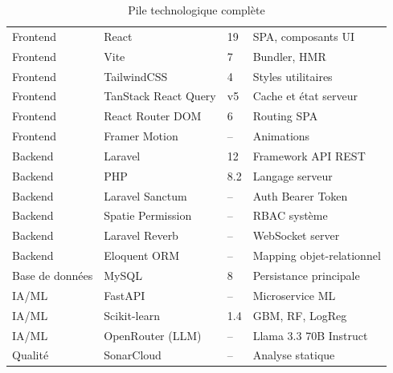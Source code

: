 \begin{table}[H]
  \centering
  \caption{Pile technologique complète}
  \label{tab:techstack}
  \small
  \begin{tabularx}{\textwidth}{L{3cm}L{3.5cm}C{1.8cm}X}
    \toprule
     &  &  &  \\
    \midrule
    Frontend      & React                  & 19       & SPA, composants UI \\
    Frontend      & Vite                   & 7        & Bundler, HMR \\
    Frontend      & TailwindCSS            & 4        & Styles utilitaires \\
    Frontend      & TanStack React Query   & v5       & Cache et état serveur \\
    Frontend      & React Router DOM       & 6        & Routing SPA \\
    Frontend      & Framer Motion          & --       & Animations \\
    Backend       & Laravel                & 12       & Framework API REST \\
    Backend       & PHP                    & 8.2      & Langage serveur \\
    Backend       & Laravel Sanctum        & --       & Auth Bearer Token \\
    Backend       & Spatie Permission      & --       & RBAC système \\
    Backend       & Laravel Reverb         & --       & WebSocket server \\
    Backend       & Eloquent ORM           & --       & Mapping objet-relationnel \\
    Base de données & MySQL                & 8        & Persistance principale \\
    IA/ML         & FastAPI                & --       & Microservice ML \\
    IA/ML         & Scikit-learn           & 1.4      & GBM, RF, LogReg \\
    IA/ML         & OpenRouter (LLM)       & --       & Llama 3.3 70B Instruct \\
    Qualité       & SonarCloud             & --       & Analyse statique \\
    \bottomrule
  \end{tabularx}
\end{table}

